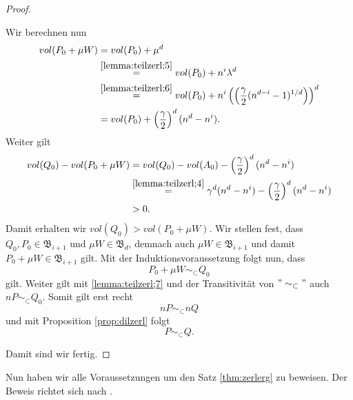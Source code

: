 \documentclass[11pt,titlepage]{article}
\theoremstyle{definition}
\theoremstyle{remark}
\begin{document}
\begin{proof}
\begin{itemize}
			Wir berechnen nun
			\begin{align*}
				vol(P_0+\mu W) &= vol(P_0)+\mu^d \\
				&\overset{\ref{lemma:teilzerl;5}}{=} vol(P_0)+n^i\lambda^d \\
				&\overset{\ref{lemma:teilzerl;6}}{=}
				 vol(P_0)+n^i\left(\left(\frac{\gamma}{2}
				(n^{d-i}-1)^{1/d}\right)\right)^d \\
				&=vol(P_0)+\left(\frac{\gamma}{2}\right)^d (n^d-n^i).
			\end{align*}
			Weiter gilt 
			\begin{align*}
				vol(Q_0)-vol(P_0+\mu W)&= vol(Q_0)-vol(A_0)-
				\left(\frac{\gamma}{2}\right)^d (n^d-n^i) \\
				&\overset{\ref{lemma:teilzerl;4}}{=} \gamma^d(n^d-n^i)-
				\left(\frac{\gamma}{2}\right)^d (n^d-n^i) \\
				&>0.
			\end{align*}
			Damit erhalten wir $vol(Q_0)>vol(P_0+\mu W)$. Wir stellen fest, 
			dass $Q_0,P_0\in\mathfrak{B}_{i+1}$ und $\mu W\in \mathfrak{B}_d$, 
			demnach auch $\mu W\in\mathfrak{B}_{i+1}$ und damit  
			$P_0+\mu W\in\mathfrak{B}_{i+1}$ gilt. Mit der Induktionsvoraussetzung 
			folgt nun, dass 
			\[P_0+\mu W\sim_{\subset} Q_0\]
			gilt. Weiter gilt mit \ref{lemma:teilzerl;7} und der Transitivität von $"\sim_{\subset}"$ auch $nP\sim_{\subset}Q_0$. 
			Somit gilt erst recht 
			\[nP\sim_{\subset}nQ\]
			und mit Proposition \ref{prop:dilzerl} folgt
			\[P\sim_{\subset}Q.\]
		\end{itemize}
	Damit sind wir fertig.
	\end{proof}
	
	Nun haben wir alle Voraussetzungen um den Satz \ref{thm:zerlerg} zu 
	beweisen. Der Beweis richtet sich nach \cite[Satz III]{Hadwiger}.
	
\end{document}
